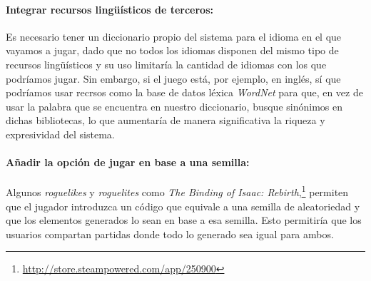 \paragraph{Integrar recursos lingüísticos de terceros:} Es necesario tener un diccionario propio del sistema para el idioma en el que vayamos a jugar, dado que no todos los idiomas disponen del mismo tipo de recursos lingüísticos y su uso limitaría la cantidad de idiomas con los que podríamos jugar. Sin embargo, si el juego está, por ejemplo, en inglés, sí que podríamos usar recrsos como la base de datos léxica \textit{WordNet}\cite{MilBecFelGroMil90a} para que, en vez de usar la palabra que se encuentra en nuestro diccionario, busque sinónimos en dichas bibliotecas, lo que aumentaría de manera significativa la riqueza y expresividad del sistema. 

\paragraph{Añadir la opción de jugar en base a una semilla:} Algunos \textit{roguelikes} y \textit{roguelites} como \textit{The Binding of Isaac: Rebirth},\footnote{\url{http://store.steampowered.com/app/250900}} permiten que el jugador introduzca un código que equivale a una semilla de aleatoriedad y que los elementos generados lo sean en base a esa semilla.\cite{Betts2014a} Esto permitiría que los usuarios compartan partidas donde todo lo generado sea igual para ambos.